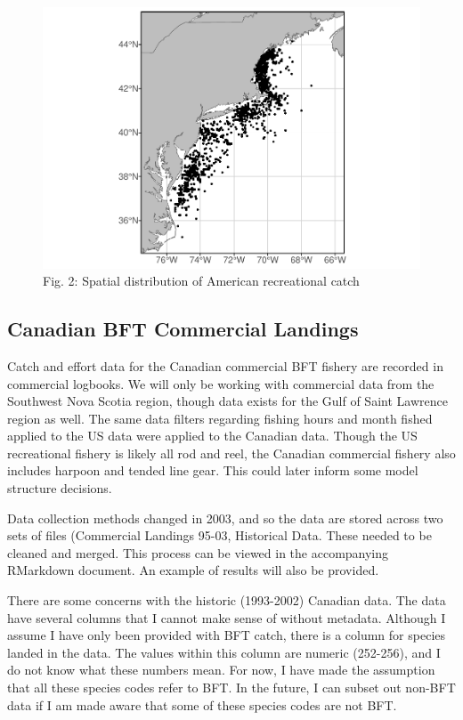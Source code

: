 \documentclass[
]{article}
\begin{document}
\begin{figure}
\centering
\includegraphics{Model_Prelim_Report_files/figure-latex/americanplot-1.pdf}
\caption{\label{fig:americanplot}Fig. 2: Spatial distribution of American recreational catch}
\end{figure}

\hypertarget{canadian-bft-commercial-landings}{%
\subsection{Canadian BFT Commercial Landings}\label{canadian-bft-commercial-landings}}

Catch and effort data for the Canadian commercial BFT fishery are recorded in commercial logbooks. We will only be working with commercial data from the Southwest Nova Scotia region, though data exists for the Gulf of Saint Lawrence region as well. The same data filters regarding fishing hours and month fished applied to the US data were applied to the Canadian data. Though the US recreational fishery is likely all rod and reel, the Canadian commercial fishery also includes harpoon and tended line gear. This could later inform some model structure decisions.

Data collection methods changed in 2003, and so the data are stored across two sets of files (Commercial Landings 95-03, Historical Data. These needed to be cleaned and merged. This process can be viewed in the accompanying RMarkdown document. An example of results will also be provided.

There are some concerns with the historic (1993-2002) Canadian data. The data have several columns that I cannot make sense of without metadata. Although I assume I have only been provided with BFT catch, there is a column for species landed in the data. The values within this column are numeric (252-256), and I do not know what these numbers mean. For now, I have made the assumption that all these species codes refer to BFT. In the future, I can subset out non-BFT data if I am made aware that some of these species codes are not BFT.
\end{document}
